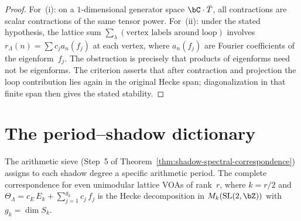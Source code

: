\begin{proof}
For~(i): on a $1$-dimensional generator space $\bC\cdot\bar{T}$,
all contractions are scalar contractions of the same tensor power.
For~(ii): under the stated hypothesis, the lattice sum
$\sum_\lambda(\text{vertex labels around loop})$ involves
$r_\Lambda(n)=\sum c_j a_n(f_j)$ at each vertex,
where $a_n(f_j)$ are Fourier coefficients of the eigenform~$f_j$.
The obstruction is precisely that products of eigenforms need not be
eigenforms. The criterion asserts that after contraction and
projection the loop contribution lies again in the original Hecke
span; diagonalization in that finite span then gives the stated
stability.
\end{proof}

\section{The period--shadow dictionary}
\label{sec:period-shadow-dictionary}

The arithmetic sieve (Step~5 of
Theorem~\ref{thm:shadow-spectral-correspondence}) assigns to each
shadow degree a specific arithmetic period. The complete correspondence for even unimodular lattice
VOAs of rank~$r$, where $k=r/2$ and
$\Theta_\Lambda = c_E\,E_k + \sum_{j=1}^{g_k} c_j\,f_j$ is
the Hecke decomposition in $M_k(\mathrm{SL}(2,\bZ))$
with $g_k = \dim S_k$.

